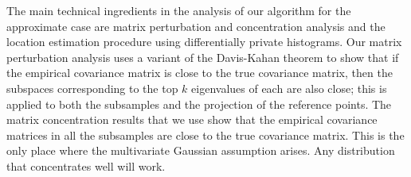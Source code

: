 The main technical ingredients in the analysis of our algorithm for the approximate case are matrix perturbation and concentration analysis and the location estimation procedure using differentially private histograms.
Our matrix perturbation analysis uses a variant of the Davis-Kahan theorem to show that if the empirical covariance matrix is close to the true covariance matrix, then the subspaces corresponding to the top $k$ eigenvalues of each are also close; this is applied to both the subsamples and the projection of the reference points.
The matrix concentration results that we use show that the empirical covariance matrices in all the subsamples are close to the true covariance matrix.
This is the only place where the multivariate Gaussian assumption arises. Any distribution that concentrates well will work.
